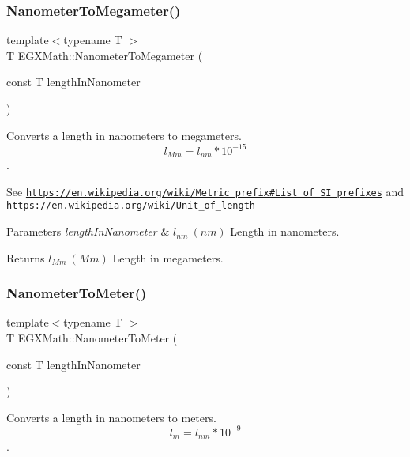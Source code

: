 \subsubsection{\texorpdfstring{Nanometer\+To\+Megameter()}{NanometerToMegameter()}}
{\footnotesize\ttfamily template$<$typename T $>$ \\
T E\+G\+X\+Math\+::\+Nanometer\+To\+Megameter (\begin{DoxyParamCaption}\item[{const T}]{length\+In\+Nanometer }\end{DoxyParamCaption})}



Converts a length in nanometers to megameters. \[ l_{Mm}=l_{nm} * 10^{-15} \]. 

See \href{https://en.wikipedia.org/wiki/Metric_prefix#List_of_SI_prefixes}{\tt https\+://en.\+wikipedia.\+org/wiki/\+Metric\+\_\+prefix\#\+List\+\_\+of\+\_\+\+S\+I\+\_\+prefixes} and \href{https://en.wikipedia.org/wiki/Unit_of_length}{\tt https\+://en.\+wikipedia.\+org/wiki/\+Unit\+\_\+of\+\_\+length} 
\begin{DoxyParams}{Parameters}
{\em length\+In\+Nanometer} & $ l_{nm}\ (nm)$ Length in nanometers. \\
\hline
\end{DoxyParams}
\begin{DoxyReturn}{Returns}
$ l_{Mm}\ (Mm)$ Length in megameters. 
\end{DoxyReturn}
\mbox{\label{group___e_g_x_math-_conversions-_length_conversions-_s_i-_nanometer-_s_i_ga2ceddcda2954e4bb6cf1216ce4edc160}} 
\subsubsection{\texorpdfstring{Nanometer\+To\+Meter()}{NanometerToMeter()}}
{\footnotesize\ttfamily template$<$typename T $>$ \\
T E\+G\+X\+Math\+::\+Nanometer\+To\+Meter (\begin{DoxyParamCaption}\item[{const T}]{length\+In\+Nanometer }\end{DoxyParamCaption})}



Converts a length in nanometers to meters. \[ l_{m}=l_{nm} * 10^{-9} \]. 


